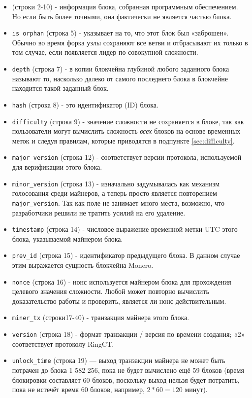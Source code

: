 \begin{appendices}
\begin{itemize}
	\item (строки 2-10) - информация блока, собранная программным обеспечением. Но если быть более точными, она фактически не является частью блока.
    \item {\tt is orphan} (строка 5) - указывает на то, что этот блок был «заброшен». Обычно во время форка узлы сохраняют все ветви и отбрасывают их только в том случае, если появляется лидер по совокупной сложности.
    \item {\tt depth} (строка 7) - в копии блокчейна глубиной любого заданного блока называют то, насколько далеко от самого последнего блока в блокчейне находится такой заданный блок.
    \item {\tt hash} (строка 8) - это идентификатор (ID) блока.
    \item {\tt difficulty} (строка 9) - значение сложности не сохраняется в блоке, так как пользовате\-ли могут вычислить сложность {\em всех} блоков на основе временных меток и следуя прави\-лам, которые приводятся в подпункте \ref{sec:difficulty}.
    \item {\tt major\_version} (строка 12) - соответствует версии протокола, используемой для верифи\-кации этого блока.
    \item {\tt minor\_version} (строка 13) - изначально задумывалась как механизм голосования среди майнеров, а теперь просто является повторением {\tt major\_version}. Так как поле не занимает много места, возможно, что разработчики решили не тратить усилий на его удаление.
    \item {\tt timestamp} (строка 14) - числовое выражение временной метки UTC этого блока, указы\-ваемой майнером блока.
    \item {\tt prev\_id} (строка 15) - идентификатор предыдущего блока. В данном случае этим выра\-жается сущность блокчейна Monero.
    \item {\tt nonce} (строка 16) - нонс используется майнером блока для прохождения целевого значе\-ния сложности. Любой может повторно вычислить доказательство работы и проверить, является ли нонс действительным.
    \item {\tt miner\_tx} (строки17-40) - транзакция майнера этого блока.
    \item {\tt version} (строка 18) - формат транзакции / версия по времени создания; «2» соответ\-ствует протоколу RingCT.
    \item {\tt unlock\_time} (строка 19) — выход транзакции майнера не может быть потрачен до блока 1 582 256\nth, пока не будет вычислено ещё 59 блоков (время блокировки составляет 60 блоков, поскольку выход нельзя будет потратить, пока не истечёт время 60 блоков, например, $2*60 = 120$ минут).

\end{itemize}
\end{appendices}
